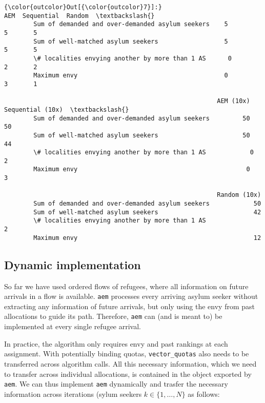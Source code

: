 \documentclass[11pt]{article}
\begin{document}
\begin{Verbatim}[commandchars=\\\{\}]
{\color{outcolor}Out[{\color{outcolor}7}]:}                                                   AEM  Sequential  Random  \textbackslash{}
        Sum of demanded and over-demanded asylum seekers    5           5       5   
        Sum of well-matched asylum seekers                  5           5       5   
        \# localities envying another by more than 1 AS      0           2       2   
        Maximum envy                                        0           3       1   
        
                                                          AEM (10x)  Sequential (10x)  \textbackslash{}
        Sum of demanded and over-demanded asylum seekers         50                50   
        Sum of well-matched asylum seekers                       50                44   
        \# localities envying another by more than 1 AS            0                 2   
        Maximum envy                                              0                 3   
        
                                                          Random (10x)  
        Sum of demanded and over-demanded asylum seekers            50  
        Sum of well-matched asylum seekers                          42  
        \# localities envying another by more than 1 AS               2  
        Maximum envy                                                12  
\end{Verbatim}
            
    \hypertarget{dynamic-implementation}{%
\subsection{Dynamic implementation}\label{dynamic-implementation}}

So far we have used ordered flows of refugees, where all information on
future arrivals in a flow is available. \texttt{aem} processes every
arriving asylum seeker without extracting any information of future
arrivals, but only using the envy from past allocations to guide its
path. Therefore, \texttt{aem} can (and is meant to) be implemented at
every single refugee arrival.

In practice, the algorithm only requires envy and past rankings at each
assignment. With potentially binding quotas, \texttt{vector\_quotas}
also needs to be transferred across algorithm calls. All this necessary
information, which we need to transfer across individual allocations, is
contained in the object exported by \texttt{aem}. We can thus implement
\texttt{aem} dynamically and trasfer the necessary information across
iterations (sylum seekers \(k \in \{1,\ldots,N\}\) as follows:
\end{document}
